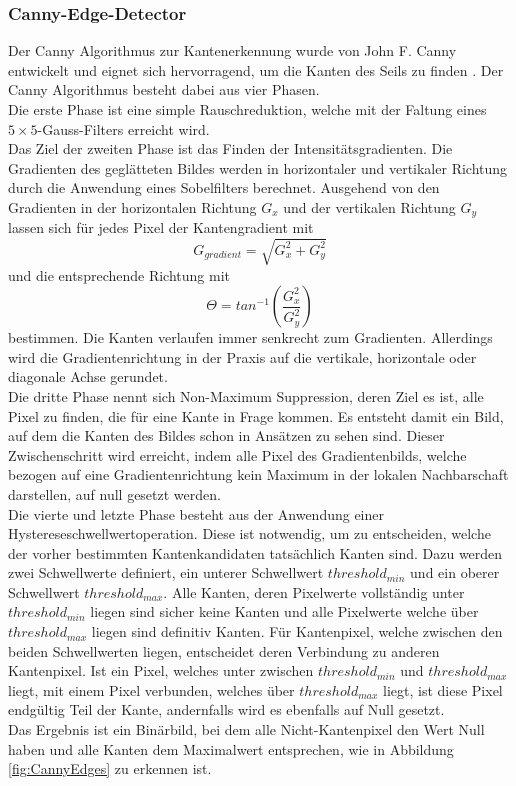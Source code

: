 \documentclass[10pt,a4paper]{scrarticle}
\begin{document}
		\subsubsection{Canny-Edge-Detector}\label{CannySubsection}
		Der Canny Algorithmus zur Kantenerkennung wurde von John F. Canny entwickelt und eignet sich hervorragend, um die Kanten des Seils zu finden 		\cite{canny_computational_1986}. Der Canny Algorithmus besteht dabei aus vier Phasen.\\ 
		Die erste Phase ist eine simple Rauschreduktion, welche mit der Faltung eines $5\times5$-Gauss-Filters erreicht wird.\\
	    Das Ziel der zweiten Phase ist das Finden der Intensitätsgradienten. Die Gradienten des geglätteten Bildes werden in horizontaler und vertikaler Richtung durch die Anwendung eines Sobelfilters berechnet. Ausgehend von den Gradienten in der horizontalen Richtung $G_x$ und der vertikalen Richtung $G_y$ lassen sich für jedes Pixel der Kantengradient mit \\
	    \begin{equation}
        G_{gradient}=\sqrt{G^2_x + G^2_y}
        \end{equation}
        und die entsprechende Richtung mit\\
        \begin{equation}
        \Theta=tan^{-1}\left(\frac{G^2_x}{G^2_y}\right)
        \end{equation} bestimmen.
        Die Kanten verlaufen immer senkrecht zum Gradienten. Allerdings wird die  Gradientenrichtung in der Praxis auf die vertikale, horizontale oder diagonale Achse gerundet.\\
        Die dritte Phase nennt sich Non-Maximum Suppression, deren Ziel es ist, alle Pixel zu finden, die für eine Kante in Frage kommen. Es entsteht damit ein Bild, auf dem die Kanten des Bildes schon in Ansätzen zu sehen sind. Dieser Zwischenschritt wird erreicht, indem alle Pixel des Gradientenbilds, welche bezogen auf eine Gradientenrichtung kein Maximum in der lokalen Nachbarschaft darstellen, auf null gesetzt werden.\\
        Die vierte und letzte Phase besteht aus der Anwendung einer Hystereseschwellwertoperation. Diese ist notwendig, um zu entscheiden, welche der vorher bestimmten Kantenkandidaten tatsächlich Kanten sind. Dazu werden zwei Schwellwerte definiert, ein unterer Schwellwert $threshold_{min}$ und ein oberer Schwellwert $threshold_{max}$. Alle Kanten, deren Pixelwerte vollständig unter $threshold_{min}$ liegen sind sicher keine Kanten und alle Pixelwerte welche über $threshold_{max}$ liegen sind definitiv Kanten. Für Kantenpixel, welche zwischen den beiden Schwellwerten liegen, entscheidet deren Verbindung zu anderen Kantenpixel. Ist ein Pixel, welches unter zwischen $threshold_{min}$ und $threshold_{max}$ liegt, mit einem Pixel verbunden, welches über $threshold_{max}$ liegt, ist diese Pixel endgültig Teil der Kante, andernfalls wird es ebenfalls auf Null gesetzt.\\
        Das Ergebnis ist ein Binärbild, bei dem alle Nicht-Kantenpixel den Wert Null haben und alle Kanten dem Maximalwert entsprechen, wie in Abbildung \ref{fig:CannyEdges} zu erkennen ist. 
        
\end{document}

